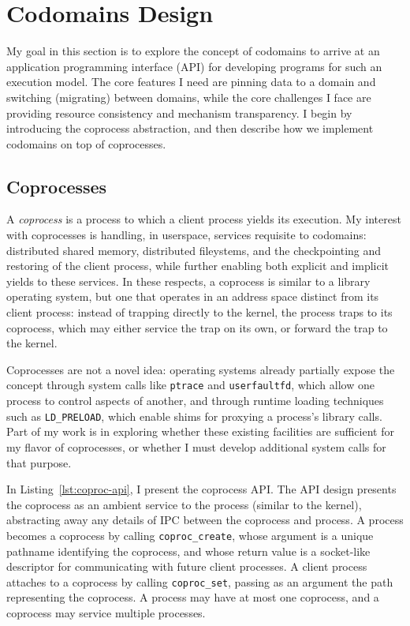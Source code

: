 \section{Codomains Design}
\label{sec:codomains-design}

My goal in this section is to explore the concept of codomains to arrive at an
application programming interface (API) for developing programs for such an
execution model.
%
The core features I need are pinning data to a domain and switching
(migrating) between domains, while the core challenges I face are providing
resource consistency and mechanism transparency.
%
I begin by introducing the coprocess abstraction, and then describe how we
implement codomains on top of coprocesses.


\subsection{Coprocesses}

A \emph{coprocess} is a process to which a client process yields its
execution.
%
My interest with coprocesses is handling, in userspace, services requisite to
codomains: distributed shared memory, distributed fileystems, and the
checkpointing and restoring of the client process, while further enabling both
explicit and implicit yields to these services.
%
In these respects, a coprocess is similar to a library operating system, but
one that operates in an address space distinct from its client process: instead of
trapping directly to the kernel, the process traps to its coprocess, which may
either service the trap on its own, or forward the trap to the kernel.


Coprocesses are not a novel idea: operating systems already partially expose the
concept through system calls like \texttt{ptrace} and
\texttt{userfaultfd}, which allow one process to control aspects of another,
and through runtime loading techniques such as \texttt{LD\_PRELOAD}, which
enable shims for proxying a process's library calls.
%
Part of my work is in exploring whether these existing facilities are
sufficient for my flavor of coprocesses, or whether I must develop additional
system calls for that purpose.


%
In Listing~\ref{lst:coproc-api}, I present the coprocess API\@.
%
The API design presents the coprocess as an ambient service to the process
(similar to the kernel), abstracting away any details of IPC between the
coprocess and process.
%
A process becomes a coprocess by calling \texttt{coproc\_create}, whose
argument is a unique pathname identifying the coprocess, and whose return value
is a socket-like descriptor for communicating with future client processes.
%
A client process attaches to a coprocess by calling \texttt{coproc\_set}, passing as an
argument the path representing the coprocess.
%
A process may have at most one coprocess, and a coprocess may service multiple
processes.
%


